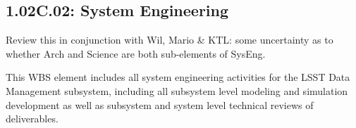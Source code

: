 \subsection{1.02C.02: System Engineering}

\begin{note}
Review this in conjunction with Wil, Mario \& KTL: some uncertainty as to
whether Arch and Science are both sub-elements of SysEng.
\end{note}

This WBS element includes all system engineering activities for the LSST Data
Management subsystem, including all subsystem level modeling and simulation
development as well as subsystem and system level technical reviews of
deliverables.
